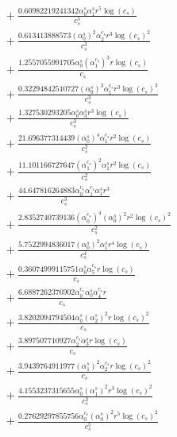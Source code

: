 \documentclass[10pt]{article}
\begin{document}
\begin{align*}
&{}  + \frac{0.60982219241342 \alpha_{0}^s \alpha_{1}^s r^{5} \log{\left(c_{s} \right)}}{c_{s}^{5}} \\
&{}  + \frac{0.613413888573 \left(\alpha_{0}^s\right)^{2} \alpha_{2}^{c_s} r^{3} \log{\left(c_{s} \right)}^{2}}{c_{s}^{3}} \\
&{}  + \frac{1.2557055991705 \alpha_{0}^s \left(\alpha_{1}^{c_s}\right)^{3} r \log{\left(c_{s} \right)}}{c_{s}} \\
&{}  + \frac{0.32294842510727 \left(\alpha_{0}^s\right)^{3} \alpha_{1}^{c_s} r^{3} \log{\left(c_{s} \right)}^{3}}{c_{s}^{3}} \\
&{}  + \frac{1.327530293205 \alpha_{0}^s \alpha_{3}^s r^{3} \log{\left(c_{s} \right)}}{c_{s}^{3}} \\
&{}  + \frac{21.696377314439 \left(\alpha_{0}^s\right)^{4} \alpha_{1}^{c_s} r^{2} \log{\left(c_{s} \right)}}{c_{s}^{2}} \\
&{}  + \frac{11.101166727647 \left(\alpha_{1}^{c_s}\right)^{2} \alpha_{1}^s r^{2} \log{\left(c_{s} \right)}}{c_{s}^{2}} \\
&{}  + \frac{44.647816264883 \alpha_{0}^{c_s} \alpha_{1}^{c_s} \alpha_{1}^s r^{3}}{c_{s}^{3}} \\
&{}  + \frac{2.8352740739136 \left(\alpha_{0}^{c_s}\right)^{4} \left(\alpha_{0}^s\right)^{2} r^{2} \log{\left(c_{s} \right)}^{2}}{c_{s}^{2}} \\
&{}  + \frac{5.7522994836017 \left(\alpha_{0}^s\right)^{2} \alpha_{1}^s r^{4} \log{\left(c_{s} \right)}}{c_{s}^{4}} \\
&{}  + \frac{0.36074999115751 \alpha_{0}^s \alpha_{5}^{c_s} r \log{\left(c_{s} \right)}}{c_{s}} \\
&{}  + \frac{6.6887262376902 \alpha_{0}^{c_s} \alpha_{0}^s \alpha_{4}^{c_s} r}{c_{s}} \\
&{}  + \frac{3.8202094794504 \alpha_{0}^s \left(\alpha_{2}^s\right)^{2} r \log{\left(c_{s} \right)}^{2}}{c_{s}} \\
&{}  + \frac{3.897507710927 \alpha_{2}^{c_s} \alpha_{3}^s r \log{\left(c_{s} \right)}}{c_{s}} \\
&{}  + \frac{3.9439764911977 \left(\alpha_{1}^s\right)^{2} \alpha_{2}^{c_s} r \log{\left(c_{s} \right)}^{2}}{c_{s}} \\
&{}  + \frac{4.1553237315655 \alpha_{0}^s \left(\alpha_{1}^s\right)^{2} r^{3} \log{\left(c_{s} \right)}^{2}}{c_{s}^{3}} \\
&{}  + \frac{0.27629297855756 \alpha_{0}^{c_s} \left(\alpha_{0}^s\right)^{2} r^{5} \log{\left(c_{s} \right)}^{2}}{c_{s}^{5}} \\

\end{align*}
\end{document}
